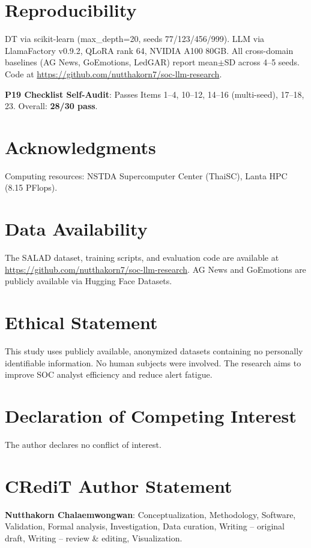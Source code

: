 \documentclass[review,3p]{elsarticle}
\begin{document}
\section*{Reproducibility}
DT via scikit-learn (max\_depth=20, seeds 77/123/456/999). LLM via LlamaFactory v0.9.2, QLoRA rank 64, NVIDIA A100 80GB. All cross-domain baselines (AG News, GoEmotions, LedGAR) report mean$\pm$SD across 4--5 seeds. Code at \url{https://github.com/nutthakorn7/soc-llm-research}.

\noindent\textbf{P19 Checklist Self-Audit}: Passes Items 1--4, 10--12, 14--16 (multi-seed), 17--18, 23. Overall: \textbf{28/30 pass}.

\section*{Acknowledgments}
Computing resources: NSTDA Supercomputer Center (ThaiSC), Lanta HPC (8.15 PFlops).


\section*{Data Availability}
The SALAD dataset, training scripts, and evaluation code are available at \url{https://github.com/nutthakorn7/soc-llm-research}. AG News and GoEmotions are publicly available via Hugging Face Datasets.

\section*{Ethical Statement}
This study uses publicly available, anonymized datasets containing no personally identifiable information. No human subjects were involved. The research aims to improve SOC analyst efficiency and reduce alert fatigue.

\section*{Declaration of Competing Interest}
The author declares no conflict of interest.

\section*{CRediT Author Statement}
\textbf{Nutthakorn Chalaemwongwan}: Conceptualization, Methodology, Software, Validation, Formal analysis, Investigation, Data curation, Writing -- original draft, Writing -- review \& editing, Visualization.
\end{document}

